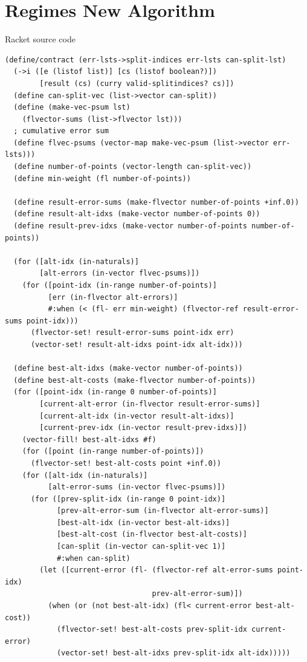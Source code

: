 \documentclass{article}
\begin{document}
\section{Regimes New Algorithm}
Racket source code
\label{appendix:new-algorithm} 
\begin{lstlisting}
(define/contract (err-lsts->split-indices err-lsts can-split-lst)
  (->i ([e (listof list)] [cs (listof boolean?)]) 
        [result (cs) (curry valid-splitindices? cs)])
  (define can-split-vec (list->vector can-split))
  (define (make-vec-psum lst)
    (flvector-sums (list->flvector lst)))
  ; cumulative error sum
  (define flvec-psums (vector-map make-vec-psum (list->vector err-lsts)))
  (define number-of-points (vector-length can-split-vec))
  (define min-weight (fl number-of-points))
  
  (define result-error-sums (make-flvector number-of-points +inf.0))
  (define result-alt-idxs (make-vector number-of-points 0))
  (define result-prev-idxs (make-vector number-of-points number-of-points))
  
  (for ([alt-idx (in-naturals)]
        [alt-errors (in-vector flvec-psums)])
    (for ([point-idx (in-range number-of-points)]
          [err (in-flvector alt-errors)]
          #:when (< (fl- err min-weight) (flvector-ref result-error-sums point-idx)))
      (flvector-set! result-error-sums point-idx err)
      (vector-set! result-alt-idxs point-idx alt-idx)))

  (define best-alt-idxs (make-vector number-of-points))
  (define best-alt-costs (make-flvector number-of-points))
  (for ([point-idx (in-range 0 number-of-points)]
        [current-alt-error (in-flvector result-error-sums)]
        [current-alt-idx (in-vector result-alt-idxs)]
        [current-prev-idx (in-vector result-prev-idxs)])
    (vector-fill! best-alt-idxs #f)
    (for ([point (in-range number-of-points)])
      (flvector-set! best-alt-costs point +inf.0))
    (for ([alt-idx (in-naturals)]
          [alt-error-sums (in-vector flvec-psums)])
      (for ([prev-split-idx (in-range 0 point-idx)]
            [prev-alt-error-sum (in-flvector alt-error-sums)]
            [best-alt-idx (in-vector best-alt-idxs)]
            [best-alt-cost (in-flvector best-alt-costs)]
            [can-split (in-vector can-split-vec 1)]
            #:when can-split)
        (let ([current-error (fl- (flvector-ref alt-error-sums point-idx) 
                                  prev-alt-error-sum)])
          (when (or (not best-alt-idx) (fl< current-error best-alt-cost))
            (flvector-set! best-alt-costs prev-split-idx current-error)
            (vector-set! best-alt-idxs prev-split-idx alt-idx)))))


\end{lstlisting}
\end{document}

